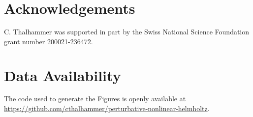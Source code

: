 \documentclass[a4paper,reqno,twoside]{amsart}
\numberwithin{equation}{section}
\theoremstyle{definition}
\newcommand{\<}{\ensuremath \leq}
\renewcommand{\>}{\ensuremath \geq}
\begin{document}
\section*{Acknowledgements}
C. Thalhammer was supported in part by the Swiss National Science Foundation grant number 200021-236472. 

\section*{Data Availability}
The code used to generate the Figures is openly available at \url{https://github.com/cthalhammer/perturbative-nonlinear-helmholtz}.

\appendix


\printbibliography
\end{document}
